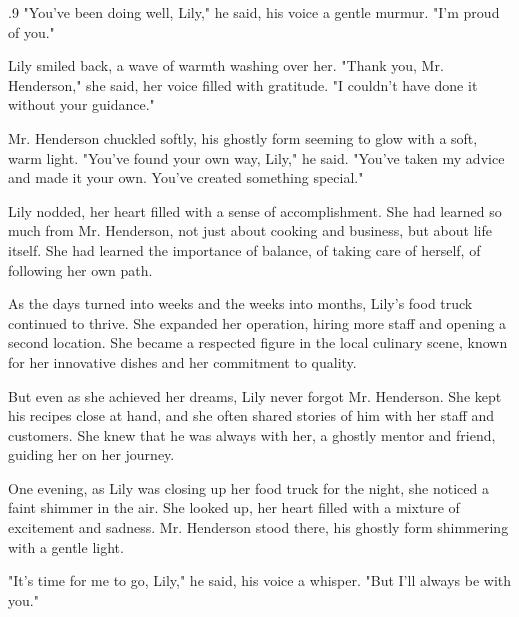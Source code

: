 \documentclass{article}
\newcommand{\Agentsroomzs}{\textsc{Agents' Room$_{ZS}$}}
\begin{document}
\begin{tcolorbox}[colback=white, colframe=gray!30!white, coltitle=black, parskip=5mm, title=
    \textbf{System output: \Agentsroomzs}, breakable]
\begin{spacing}{.9}
"You've been doing well, Lily," he said, his voice a gentle murmur. "I'm proud of you."\\\par

Lily smiled back, a wave of warmth washing over her. "Thank you, Mr. Henderson," she said, her voice filled with gratitude. "I couldn't have done it without your guidance."\\\par

Mr. Henderson chuckled softly, his ghostly form seeming to glow with a soft, warm light. "You've found your own way, Lily," he said. "You've taken my advice and made it your own. You've created something special."\\\par

Lily nodded, her heart filled with a sense of accomplishment. She had learned so much from Mr. Henderson, not just about cooking and business, but about life itself. She had learned the importance of balance, of taking care of herself, of following her own path.\\\par

As the days turned into weeks and the weeks into months, Lily's food truck continued to thrive. She expanded her operation, hiring more staff and opening a second location. She became a respected figure in the local culinary scene, known for her innovative dishes and her commitment to quality.\\\par

But even as she achieved her dreams, Lily never forgot Mr. Henderson. She kept his recipes close at hand, and she often shared stories of him with her staff and customers. She knew that he was always with her, a ghostly mentor and friend, guiding her on her journey.\\\par

One evening, as Lily was closing up her food truck for the night, she noticed a faint shimmer in the air. She looked up, her heart filled with a mixture of excitement and sadness. Mr. Henderson stood there, his ghostly form shimmering with a gentle light.\\\par

"It's time for me to go, Lily," he said, his voice a whisper. "But I'll always be with you."\\\par


\end{spacing}
\end{tcolorbox}
\end{document}
